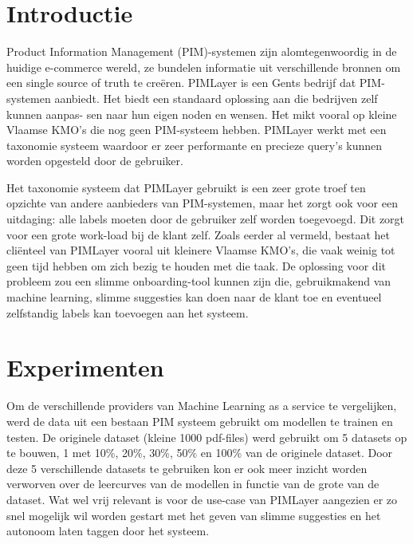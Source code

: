 \documentclass[a0,portrait]{a0poster}
\begin{document}
\begin{multicols}{2}
\color{HoGentAccent1} 
\section*{Introductie}
\color{black}
\color{black}
Product Information Management (PIM)-systemen zijn alomtegenwoordig in de huidige e-commerce wereld, ze bundelen informatie uit verschillende bronnen om een single source of truth te creëren. PIMLayer is een Gents bedrijf dat PIM-systemen aanbiedt. Het biedt een standaard oplossing aan die bedrijven zelf kunnen aanpas- sen naar hun eigen noden en wensen. Het mikt vooral op kleine Vlaamse KMO’s die nog geen PIM-systeem hebben. PIMLayer werkt met een taxonomie systeem waardoor er zeer performante en precieze query’s kunnen worden opgesteld door de gebruiker.

Het taxonomie systeem dat PIMLayer gebruikt is een zeer grote troef ten opzichte van andere aanbieders van PIM-systemen, maar het zorgt ook voor een uitdaging: alle labels moeten door de gebruiker zelf worden toegevoegd. Dit zorgt voor een grote work-load bij de klant zelf. Zoals eerder al vermeld, bestaat het cliënteel van PIMLayer vooral uit kleinere Vlaamse KMO’s, die vaak weinig tot geen tijd hebben om zich bezig te houden met die taak. De oplossing voor dit probleem zou een slimme onboarding-tool kunnen zijn die, gebruikmakend van machine learning, slimme suggesties kan doen naar de klant toe en eventueel zelfstandig labels kan toevoegen aan het systeem.

\color{Black} %
\color{HoGentAccent1} 
\section*{Experimenten}
\color{black}
Om de verschillende providers van Machine Learning as a service te vergelijken, werd de data uit een bestaan PIM systeem gebruikt om modellen te trainen en testen. De originele dataset (kleine 1000 pdf-files) werd gebruikt om 5 datasets op te bouwen, 1 met 10\%, 20\%, 30\%, 50\% en 100\% van de originele dataset. Door deze 5 verschillende datasets te gebruiken kon er ook meer inzicht worden verworven over de leercurves van de modellen in functie van de grote van de dataset. Wat wel vrij relevant is voor de use-case van PIMLayer aangezien er zo snel mogelijk wil worden gestart met het geven van slimme suggesties en het autonoom laten taggen door het systeem.  


\end{multicols}
\end{document}

